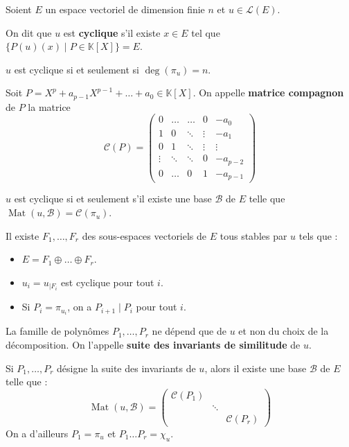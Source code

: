 
	Soient $E$ un espace vectoriel de dimension finie $n$ et $u \in \mathcal{L}(E)$.

	\begin{definition}
		On dit que $u$ est \textbf{cyclique} s'il existe $x \in E$ tel que $\{ P(u)(x) \mid P \in \mathbb{K}[X] \} = E$.
	\end{definition}

	\begin{proposition}
		$u$ est cyclique si et seulement si $\deg(\pi_u) = n$.
	\end{proposition}

	\begin{definition}
		Soit $P = X^p + a_{p-1} X^{p-1} + \dots + a_0 \in \mathbb{K}[X]$. On appelle \textbf{matrice compagnon} de $P$ la matrice
		\[ \mathcal{C}(P) = \begin{pmatrix} 0 & \dots & \dots & 0 & -a_0 \\ 1 & 0 & \ddots & \vdots & -a_1 \\ 0 & 1 & \ddots & \vdots & \vdots \\ \vdots & \ddots & \ddots & 0 & -a_{p-2} \\ 0 & \dots & 0 & 1 & -a_{p-1} \end{pmatrix} \]
	\end{definition}

	\begin{proposition}
		$u$ est cyclique si et seulement s'il existe une base $\mathcal{B}$ de $E$ telle que $\operatorname{Mat}(u, \mathcal{B}) = \mathcal{C}(\pi_u)$.
	\end{proposition}

	\begin{theorem}
		Il existe $F_1, \dots, F_r$ des sous-espaces vectoriels de $E$ tous stables par $u$ tels que :
		\begin{itemize}
			\item $E = F_1 \oplus \dots \oplus F_r$.
			\item $u_i = u_{|F_i}$ est cyclique pour tout $i$.
			\item Si $P_i = \pi_{u_i}$, on a $P_{i+1} \mid P_i$ pour tout $i$.
		\end{itemize}
		La famille de polynômes $P_1, \dots, P_r$ ne dépend que de $u$ et non du choix de la décomposition. On l'appelle \textbf{suite des invariants de similitude} de $u$.
	\end{theorem}

	\begin{theorem}
		Si $P_1, \dots, P_r$ désigne la suite des invariants de $u$, alors il existe une base $\mathcal{B}$ de $E$ telle que :
		\[ \operatorname{Mat}(u, \mathcal{B}) = \begin{pmatrix} \mathcal{C}(P_1) & & \\ & \ddots & \\ & & \mathcal{C}(P_r) \end{pmatrix} \]
		On a d'ailleurs $P_1 = \pi_u$ et $P_1 \dots P_r = \chi_u$.
	\end{theorem}

